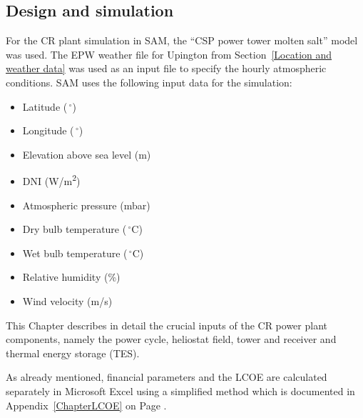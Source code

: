 \subsection{Design  and simulation} \label{CR power plant design  and simulation}
For the CR plant simulation in SAM, the \enquote{CSP power tower molten salt} model was used. The EPW weather file for Upington from Section~\ref{Location and weather data} was used as an input file to specify the hourly atmospheric conditions. SAM uses the following input data for the simulation:
\begin{itemize}
\item Latitude ($\,^{\circ}$)
\item Longitude ($\,^{\circ}$)
\item Elevation above sea level (m)
\item DNI (W/m\textsuperscript{2})
\item Atmospheric pressure (mbar)
\item Dry bulb temperature ($\,^{\circ}\mathrm{C}$)
\item Wet bulb temperature ($\,^{\circ}\mathrm{C}$)
\item Relative humidity (\%)
\item Wind velocity (m/s)
\end{itemize}
This Chapter describes in detail the crucial inputs of the CR power plant components, namely the power cycle, heliostat field, tower and receiver and thermal energy storage (TES).

As already mentioned, financial parameters and the LCOE are calculated separately in Microsoft Excel using a simplified method which is documented in Appendix~\ref{ChapterLCOE} on Page \pageref{ChapterLCOE}.

